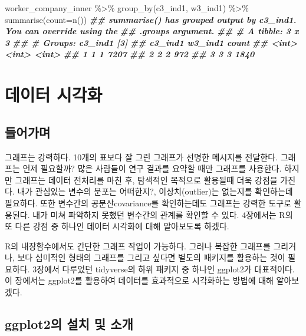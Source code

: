 \documentclass[
]{book}
\newenvironment{Shaded}{\begin{snugshade}}{\end{snugshade}}
\newcommand{\AttributeTok}[1]{\textcolor[rgb]{0.77,0.63,0.00}{#1}}
\newcommand{\DocumentationTok}[1]{\textcolor[rgb]{0.56,0.35,0.01}{\textbf{\textit{#1}}}}
\newcommand{\FunctionTok}[1]{\textcolor[rgb]{0.00,0.00,0.00}{#1}}
\newcommand{\NormalTok}[1]{#1}
\newcommand{\SpecialCharTok}[1]{\textcolor[rgb]{0.00,0.00,0.00}{#1}}
\theoremstyle{definition}
\theoremstyle{definition}
\theoremstyle{definition}
\theoremstyle{definition}
\theoremstyle{remark}
\begin{document}
\begin{Shaded}
\begin{Highlighting}[]
\NormalTok{worker\_company\_inner }\SpecialCharTok{\%\textgreater{}\%} 
  \FunctionTok{group\_by}\NormalTok{(c3\_ind1, w3\_ind1) }\SpecialCharTok{\%\textgreater{}\%} 
  \FunctionTok{summarise}\NormalTok{(}\AttributeTok{count=}\FunctionTok{n}\NormalTok{())}
\DocumentationTok{\#\# \textasciigrave{}summarise()\textasciigrave{} has grouped output by \textquotesingle{}c3\_ind1\textquotesingle{}. You can override using the}
\DocumentationTok{\#\# \textasciigrave{}.groups\textasciigrave{} argument.}
\DocumentationTok{\#\# \# A tibble: 3 x 3}
\DocumentationTok{\#\# \# Groups:   c3\_ind1 [3]}
\DocumentationTok{\#\#   c3\_ind1 w3\_ind1 count}
\DocumentationTok{\#\#     \textless{}int\textgreater{}   \textless{}int\textgreater{} \textless{}int\textgreater{}}
\DocumentationTok{\#\# 1       1       1  7207}
\DocumentationTok{\#\# 2       2       2   972}
\DocumentationTok{\#\# 3       3       3  1840}
\end{Highlighting}
\end{Shaded}

\hypertarget{graph}{%
\chapter{데이터 시각화}\label{graph}}

\hypertarget{uxb4e4uxc5b4uxac00uxba70-1}{%
\section{들어가며}\label{uxb4e4uxc5b4uxac00uxba70-1}}

그래프는 강력하다. 10개의 표보다 잘 그린 그래프가 선명한 메시지를 전달한다. 그래프는 언제 필요할까? 많은 사람들이 연구 결과를 요약할 때만 그래프를 사용한다. 하지만 그래프는 데이터 전처리를 마친 후, 탐색적인 목적으로 활용될때 더욱 강점을 가진다. 내가 관심있는 변수의 분포는 어떠한지?, 이상치(outlier)는 없는지를 확인하는데 필요하다. 또한 변수간의 공분산covariance를 확인하는데도 그래프는 강력한 도구로 활용된다. 내가 미쳐 파악하지 못했던 변수간의 관계를 확인할 수 있다. 4장에서는 R의 또 다른 강점 중 하나인 데이터 시각화에 대해 알아보도록 하겠다.

R의 내장함수에서도 간단한 그래프 작업이 가능하다. 그러나 복잡한 그래프를 그리거나, 보다 심미적인 형태의 그래프를 그리고 싶다면 별도의 패키지를 활용하는 것이 필요하다. 3장에서 다루었던 tidyverse의 하위 패키지 중 하나인 ggplot2가 대표적이다. 이 장에서는 ggplot2를 활용하여 데이터를 효과적으로 시각화하는 방법에 대해 알아보겠다.

\hypertarget{ggplot2uxc758-uxc124uxce58-uxbc0f-uxc18cuxac1c}{%
\section{ggplot2의 설치 및 소개}\label{ggplot2uxc758-uxc124uxce58-uxbc0f-uxc18cuxac1c}}
\end{document}
